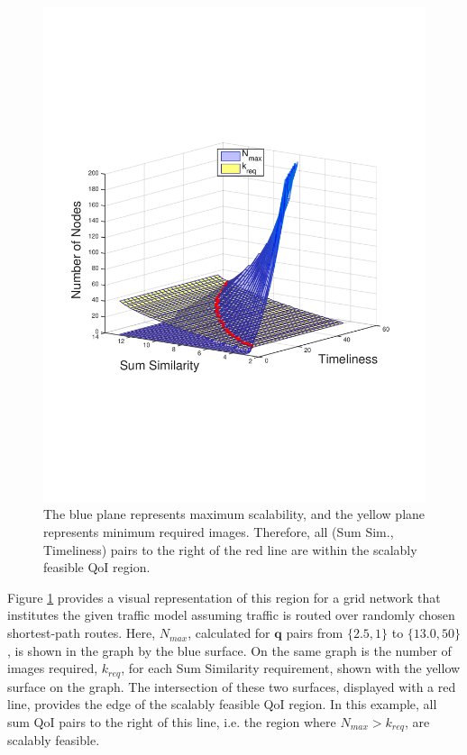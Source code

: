 \vspace{-3mm}
\begin{figure}[ht]
\centering
\includegraphics[scale=0.31, clip=true, trim=10mm 65mm 20mm 77mm]{figures/scal_feas_qoi/scal_feas_qoi_region_3d_plot_3.pdf}
\vspace{-3mm}
\caption{The blue plane represents maximum scalability, and the yellow plane represents minimum required images.  Therefore, all (Sum Sim., Timeliness) pairs to the right of the red line are within the scalably feasible QoI region.}
 \label{fig:scal_feasible_region}
 \vspace{-3mm}
\end{figure}

Figure \ref{fig:scal_feasible_region} provides a visual representation of this region for a grid network that institutes the given traffic model assuming traffic is routed over randomly chosen shortest-path routes.
Here, $N_{max}$, calculated for $\mathbf{q}$ pairs from $\{2.5,1\}$ to $\{13.0, 50\}$, is shown in the graph by the blue surface.  On the same graph is the number of images required, $k_{req}$, for each Sum Similarity requirement, shown with the yellow surface on the graph.  The intersection of these two surfaces, displayed with a red line, provides the edge of the scalably feasible QoI region.  In this example, all sum QoI pairs to the right of this line, i.e. the region where $N_{max} > k_{req}$, are scalably feasible.  

